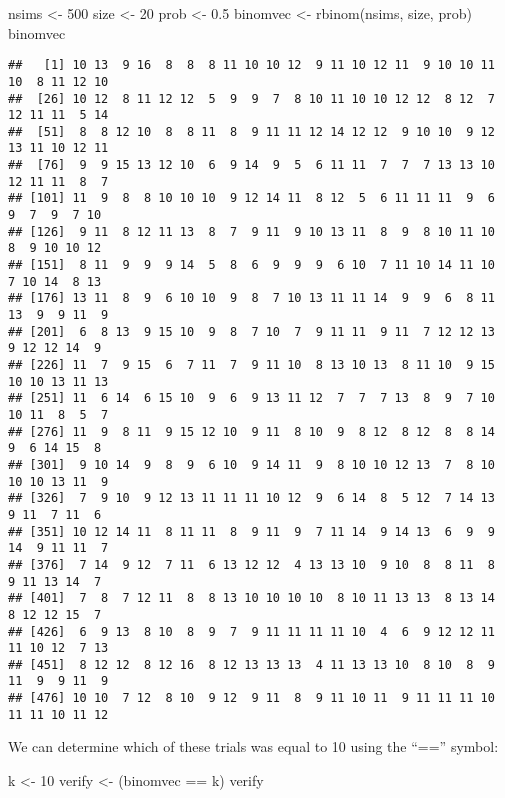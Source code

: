 \documentclass[
]{book}
\newenvironment{Shaded}{\begin{snugshade}}{\end{snugshade}}
\newcommand{\DecValTok}[1]{\textcolor[rgb]{0.00,0.00,0.81}{#1}}
\newcommand{\FloatTok}[1]{\textcolor[rgb]{0.00,0.00,0.81}{#1}}
\newcommand{\FunctionTok}[1]{\textcolor[rgb]{0.00,0.00,0.00}{#1}}
\newcommand{\NormalTok}[1]{#1}
\newcommand{\OtherTok}[1]{\textcolor[rgb]{0.56,0.35,0.01}{#1}}
\newcommand{\SpecialCharTok}[1]{\textcolor[rgb]{0.00,0.00,0.00}{#1}}
\begin{document}
\begin{Shaded}
\begin{Highlighting}[]
\NormalTok{nsims }\OtherTok{\textless{}{-}} \DecValTok{500}
\NormalTok{size }\OtherTok{\textless{}{-}} \DecValTok{20}
\NormalTok{prob }\OtherTok{\textless{}{-}} \FloatTok{0.5}
\NormalTok{binomvec }\OtherTok{\textless{}{-}} \FunctionTok{rbinom}\NormalTok{(nsims, size, prob)}
\NormalTok{binomvec}
\end{Highlighting}
\end{Shaded}

\begin{verbatim}
##   [1] 10 13  9 16  8  8  8 11 10 10 12  9 11 10 12 11  9 10 10 11 10  8 11 12 10
##  [26] 10 12  8 11 12 12  5  9  9  7  8 10 11 10 10 12 12  8 12  7 12 11 11  5 14
##  [51]  8  8 12 10  8  8 11  8  9 11 11 12 14 12 12  9 10 10  9 12 13 11 10 12 11
##  [76]  9  9 15 13 12 10  6  9 14  9  5  6 11 11  7  7  7 13 13 10 12 11 11  8  7
## [101] 11  9  8  8 10 10 10  9 12 14 11  8 12  5  6 11 11 11  9  6  9  7  9  7 10
## [126]  9 11  8 12 11 13  8  7  9 11  9 10 13 11  8  9  8 10 11 10  8  9 10 10 12
## [151]  8 11  9  9  9 14  5  8  6  9  9  9  6 10  7 11 10 14 11 10  7 10 14  8 13
## [176] 13 11  8  9  6 10 10  9  8  7 10 13 11 11 14  9  9  6  8 11 13  9  9 11  9
## [201]  6  8 13  9 15 10  9  8  7 10  7  9 11 11  9 11  7 12 12 13  9 12 12 14  9
## [226] 11  7  9 15  6  7 11  7  9 11 10  8 13 10 13  8 11 10  9 15 10 10 13 11 13
## [251] 11  6 14  6 15 10  9  6  9 13 11 12  7  7  7 13  8  9  7 10 10 11  8  5  7
## [276] 11  9  8 11  9 15 12 10  9 11  8 10  9  8 12  8 12  8  8 14  9  6 14 15  8
## [301]  9 10 14  9  8  9  6 10  9 14 11  9  8 10 10 12 13  7  8 10 10 10 13 11  9
## [326]  7  9 10  9 12 13 11 11 11 10 12  9  6 14  8  5 12  7 14 13  9 11  7 11  6
## [351] 10 12 14 11  8 11 11  8  9 11  9  7 11 14  9 14 13  6  9  9 14  9 11 11  7
## [376]  7 14  9 12  7 11  6 13 12 12  4 13 13 10  9 10  8  8 11  8  9 11 13 14  7
## [401]  7  8  7 12 11  8  8 13 10 10 10 10  8 10 11 13 13  8 13 14  8 12 12 15  7
## [426]  6  9 13  8 10  8  9  7  9 11 11 11 11 10  4  6  9 12 12 11 11 10 12  7 13
## [451]  8 12 12  8 12 16  8 12 13 13 13  4 11 13 13 10  8 10  8  9 11  9  9 11  9
## [476] 10 10  7 12  8 10  9 12  9 11  8  9 11 10 11  9 11 11 11 10 11 11 10 11 12
\end{verbatim}

We can determine which of these trials was equal to 10 using the ``=='' symbol:

\begin{Shaded}
\begin{Highlighting}[]
\NormalTok{k }\OtherTok{\textless{}{-}} \DecValTok{10}
\NormalTok{verify }\OtherTok{\textless{}{-}}\NormalTok{ (binomvec }\SpecialCharTok{==}\NormalTok{ k)}
\NormalTok{verify}
\end{Highlighting}
\end{Shaded}
\end{document}
